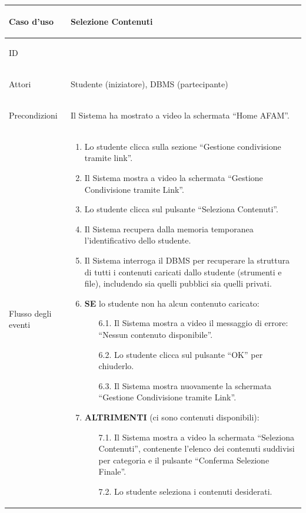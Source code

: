 \documentclass[12pt,a4paper]{article}
\begin{document}
\footnotesize
\begin{longtable}{|
>{\columncolor{unipablue}\color{white}\bfseries\raggedright\arraybackslash}p{3.4cm}|
>{\raggedright\arraybackslash}p{11.1cm}|}
\hline
Caso d’uso & Selezione Contenuti \\ \hline
ID & 4.1 \\ \hline
Attori & Studente (iniziatore), DBMS (partecipante) \\ \hline
Precondizioni & Il Sistema ha mostrato a video la schermata ``Home AFAM''. \\ \hline
Flusso degli eventi &
\begin{enumerate}[topsep=0.2em,itemsep=0.15em,parsep=0pt,partopsep=0pt]
    \item Lo studente clicca sulla sezione ``Gestione condivisione tramite link''.
    \item Il Sistema mostra a video la schermata ``Gestione Condivisione tramite Link''.
    \item Lo studente clicca sul pulsante ``Seleziona Contenuti''.
    \item Il Sistema recupera dalla memoria temporanea l'identificativo dello studente.
    \item Il Sistema interroga il DBMS per recuperare la struttura di tutti i contenuti caricati dallo studente (strumenti e file), includendo sia quelli pubblici sia quelli privati.
    \item \textbf{SE} lo studente non ha alcun contenuto caricato:
    \begin{itemize}[topsep=0.15em,itemsep=0.1em,parsep=0pt,partopsep=0pt]
        \item[6.1.] Il Sistema mostra a video il messaggio di errore: ``Nessun contenuto disponibile''.
        \item[6.2.] Lo studente clicca sul pulsante ``OK'' per chiuderlo.
        \item[6.3.] Il Sistema mostra nuovamente la schermata ``Gestione Condivisione tramite Link''.
    \end{itemize}
    \item \textbf{ALTRIMENTI} (ci sono contenuti disponibili):
    \begin{itemize}[topsep=0.15em,itemsep=0.1em,parsep=0pt,partopsep=0pt]
        \item[7.1.] Il Sistema mostra a video la schermata ``Seleziona Contenuti'', contenente l'elenco dei contenuti suddivisi per categoria e il pulsante ``Conferma Selezione Finale''.
        \item[7.2.] Lo studente seleziona i contenuti desiderati.

\end{itemize}
\end{enumerate}
\end{longtable}
\end{document}
